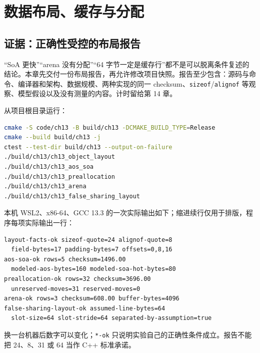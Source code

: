 \chapter{数据布局、缓存与分配}


\section{证据：正确性受控的布局报告}

“SoA 更快”“arena 没有分配”“64 字节一定是缓存行”都不是可以脱离条件复述的结论。本章先交付一份布局报告，再允许修改项目快照。报告至少包含：源码与命令、编译器和架构、数据规模、两种实现的同一 checksum、\texttt{sizeof}/\texttt{alignof} 等观察、模型假设以及没有测量的内容。计时留给第 14 章。

从项目根目录运行：

\begin{lstlisting}[language=bash,numbers=none]
cmake -S code/ch13 -B build/ch13 -DCMAKE_BUILD_TYPE=Release
cmake --build build/ch13 -j
ctest --test-dir build/ch13 --output-on-failure
./build/ch13/ch13_object_layout
./build/ch13/ch13_aos_soa
./build/ch13/ch13_preallocation
./build/ch13/ch13_arena
./build/ch13/ch13_false_sharing_layout
\end{lstlisting}

本机 WSL2、x86-64、GCC 13.3 的一次实际输出如下；缩进续行仅用于排版，程序每项实际输出一行：

\begin{lstlisting}[numbers=none]
layout-facts-ok sizeof-quote=24 alignof-quote=8
  field-bytes=17 padding-bytes=7 offsets=0,8,16
aos-soa-ok rows=5 checksum=1496.00
  modeled-aos-bytes=160 modeled-soa-hot-bytes=80
preallocation-ok rows=32 checksum=3696.00
  unreserved-moves=31 reserved-moves=0
arena-ok rows=3 checksum=608.00 buffer-bytes=4096
false-sharing-layout-ok assumed-line-bytes=64
  slot-size=64 slot-stride=64 separated-by-assumption=true
\end{lstlisting}

换一台机器后数字可以变化；\texttt{*-ok} 只说明实验自己的正确性条件成立。报告不能把 24、8、31 或 64 当作 C++ 标准承诺。

